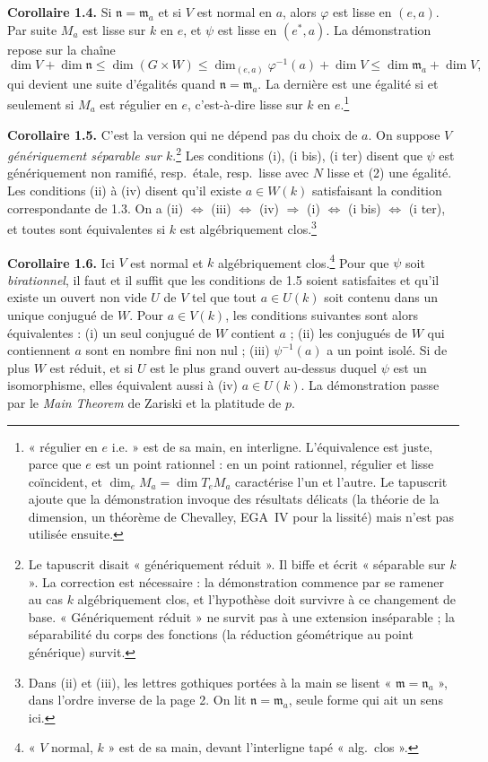 \documentclass[11pt,a4paper]{article}
\begin{document}
\textbf{Corollaire 1.4.} Si $\mathfrak{n} = \mathfrak{m}_{a}$ et si $V$ est
normal en $a$, alors $\varphi$ est lisse en $(e, a)$. Par suite $M_{a}$ est
lisse sur $k$ en $e$, et $\psi$ est lisse en $(e^{*}, a)$. La démonstration
repose sur la chaîne
\[
  \dim V + \dim \mathfrak{n} \leqslant \dim (G \times W) \leqslant
  \dim_{(e,a)} \varphi^{-1}(a) + \dim V \leqslant \dim \mathfrak{m}_{a} +
  \dim V ,
\]
qui devient une suite d'égalités quand $\mathfrak{n} = \mathfrak{m}_{a}$. La
dernière est une égalité si et seulement si $M_{a}$ est régulier en $e$,
c'est-à-dire lisse sur $k$ en $e$.\footnote{« régulier en $e$ i.e. » est de sa
main, en interligne. L'équivalence est juste, parce que $e$ est un point
rationnel : en un point rationnel, régulier et lisse coïncident, et
$\dim_{e} M_{a} = \dim T_{e} M_{a}$ caractérise l'un et l'autre. Le tapuscrit
ajoute que la démonstration invoque des résultats délicats (la théorie de la
dimension, un théorème de Chevalley, EGA~IV pour la lissité) mais n'est pas
utilisée ensuite.}

\textbf{Corollaire 1.5.} C'est la version qui ne dépend pas du choix de $a$.
On suppose $V$ \emph{génériquement séparable sur $k$}.\footnote{Le tapuscrit
disait « génériquement réduit ». Il biffe et écrit « séparable sur $k$ ». La
correction est nécessaire : la démonstration commence par se ramener au cas
$k$ algébriquement clos, et l'hypothèse doit survivre à ce changement de base.
« Génériquement réduit » ne survit pas à une extension inséparable ; la
séparabilité du corps des fonctions (la réduction géométrique au point
générique) survit.} Les conditions (i), (i bis), (i ter) disent que $\psi$
est génériquement non ramifié, resp.\ étale, resp.\ lisse avec $N$ lisse et
(2) une égalité. Les conditions (ii) à (iv) disent qu'il existe $a \in W(k)$
satisfaisant la condition correspondante de 1.3. On a
(ii) $\Leftrightarrow$ (iii) $\Leftrightarrow$ (iv) $\Rightarrow$ (i)
$\Leftrightarrow$ (i bis) $\Leftrightarrow$ (i ter), et toutes sont
équivalentes si $k$ est algébriquement clos.\footnote{Dans (ii) et (iii), les
lettres gothiques portées à la main se lisent
« $\mathfrak{m} = \mathfrak{n}_{a}$ », dans l'ordre inverse de la page 2. On
lit $\mathfrak{n} = \mathfrak{m}_{a}$, seule forme qui ait un sens ici.}

\textbf{Corollaire 1.6.} Ici $V$ est normal et $k$ algébriquement
clos.\footnote{« $V$ normal, $k$ » est de sa main, devant l'interligne tapé
« alg.\ clos ».} Pour que $\psi$ soit \emph{birationnel}, il faut et il suffit
que les conditions de 1.5 soient satisfaites et qu'il existe un ouvert non vide
$U$ de $V$ tel que tout $a \in U(k)$ soit contenu dans un unique conjugué de
$W$. Pour $a \in V(k)$, les conditions suivantes sont alors équivalentes :
(i) un seul conjugué de $W$ contient $a$ ; (ii) les conjugués de $W$ qui
contiennent $a$ sont en nombre fini non nul ; (iii) $\psi^{-1}(a)$ a un point
isolé. Si de plus $W$ est réduit, et si $U$ est le plus grand ouvert au-dessus
duquel $\psi$ est un isomorphisme, elles équivalent aussi à (iv)
$a \in U(k)$. La démonstration passe par le \emph{Main Theorem} de Zariski et
la platitude de $p$.
\end{document}
